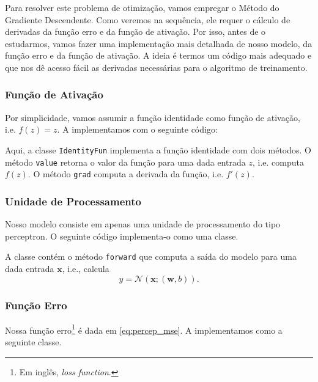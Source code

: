 Para resolver este problema de otimização, vamos empregar o Método do Gradiente Descendente. Como veremos na sequência, ele requer o cálculo de derivadas da função erro e da função de ativação. Por isso, antes de o estudarmos, vamos fazer uma implementação mais detalhada de nosso modelo, da função erro e da função de ativação. A ideia é termos um código mais adequado e que nos dê acesso fácil as derivadas necessárias para o algoritmo de treinamento.

\subsubsection{Função de Ativação}

Por simplicidade, vamos assumir a função identidade como função de ativação, i.e. $f(z)=z$. A implementamos com o seguinte código:

\ifispython

\fi

Aqui, a classe \lstinline+IdentityFun+ implementa a função identidade com dois métodos. O método \lstinline+value+ retorna o valor da função para uma dada entrada $z$, i.e. computa $f(z)$. O método \lstinline+grad+ computa a derivada da função, i.e. $f'(z)$.

\subsubsection{Unidade de Processamento}

Nosso modelo consiste em apenas uma unidade de processamento do tipo perceptron. O seguinte código implementa-o como uma classe.

\ifispython

\fi

A classe contém o método \lstinline+forward+ que computa a saída do modelo para uma dada entrada $\pmb{x}$, i.e., calcula
\begin{equation}
  y = \mathcal{N}\left(\pmb{x}; (\pmb{w}, b)\right).
\end{equation}

\subsubsection{Função Erro}

Nossa função erro\footnote{Em inglês, {\it loss function}.} é dada em \eqref{eq:percep_mse}. A implementamos como a seguinte classe.

